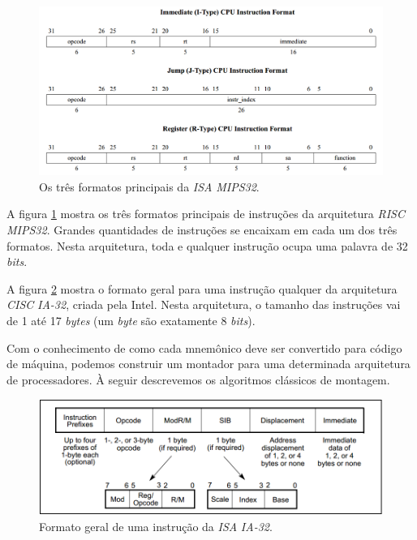 \begin{figure}[ptb]
  \begin{center}
    \includegraphics[scale=.45]{imagens/instrucoes_mips}
  \end{center}
  \caption{Os três formatos principais da \textit{ISA} \textit{MIPS32}.}
  \label{instrucoes_mips}
\end{figure}

A figura \ref{instrucoes_mips} mostra os três formatos principais de instruções da arquitetura \textit{RISC} \textit{MIPS32}. Grandes quantidades de instruções se encaixam em cada um dos três formatos. Nesta arquitetura, toda e qualquer instrução ocupa uma palavra de 32 \textit{bits}.

A figura \ref{instrucoes_ia32} mostra o formato geral para uma instrução qualquer da arquitetura \textit{CISC} \textit{IA-32}, criada pela Intel. Nesta arquitetura, o tamanho das instruções vai de 1 até 17 \textit{bytes} (um \textit{byte} são exatamente 8 \textit{bits}).

Com o conhecimento de como cada mnemônico deve ser convertido para código de máquina, podemos construir um montador para uma determinada arquitetura de processadores. À seguir descrevemos os algoritmos clássicos de montagem.

\begin{figure}[ptb]
  \begin{center}
    \includegraphics[scale=.6]{imagens/instrucoes_ia32}
  \end{center}
  \caption{Formato geral de uma instrução da \textit{ISA} \textit{IA-32}.}
  \label{instrucoes_ia32}
\end{figure}


